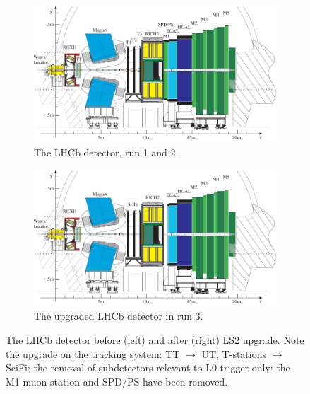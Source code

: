 \begin{figure}[!htb]
    \centering
    \begin{subfigure}[t]{0.45\textwidth}
        \centering
        \includegraphics[width=\textwidth]{./figs-detector/lhcb_detector_view.pdf}
        \caption{The LHCb detector, run 1 and 2.}
    \end{subfigure}
    \hspace{12pt}
    \begin{subfigure}[t]{0.45\textwidth}
        \centering
        \includegraphics[width=\textwidth]{./figs-lhcb-upgrade-overview/lhcb_detector_view_run3.pdf}
        \caption{The upgraded LHCb detector in run 3.}
    \end{subfigure}

    \caption{
        The LHCb detector before (left) and after (right) LS2 upgrade.
        Note the upgrade on the tracking system:
        TT $\rightarrow$ UT, T-stations $\rightarrow$ SciFi;
        the removal of subdetectors relevant to L0 trigger only:
        the M1 muon station and SPD/PS have been removed.
    }
    \label{fig:lhcb-detector-comparison}
\end{figure}

